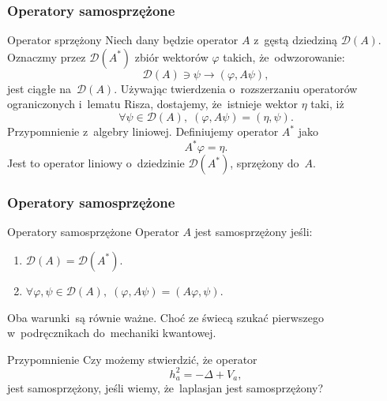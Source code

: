 \documentclass{beamer} \mode<presentation>
\newcommand{\mc}{\mathcal}
\newcommand{\ra}{\rightarrow}
\newcommand{\Del}{\Delta}
\newcommand{\vp}{\varphi}
\newcommand{\D}{\mc{D}}
\newcommand{\DA}{\D( A )}
\begin{document}
\begin{frame}
  \frametitle{Operatory samosprzężone}

  \begin{block}{Operator sprzężony}
    Niech dany będzie operator $A$ z~gęstą dziedziną $\DA$. Oznaczmy
    przez $\D( A^{ * } )$ zbiór wektorów $\vp$ takich,
    że~odwzorowanie:
    \begin{equation}
      \label{eq:12}
      \DA \ni \psi \ra ( \vp, A\psi ),
    \end{equation}
    jest ciągłe na~$\DA$. Używając twierdzenia o~rozszerzaniu
    operatorów ograniczonych i~lematu Risza, dostajemy, że~istnieje
    wektor $\eta$ taki, iż
    \begin{equation}
      \label{eq:13}
      \forall \psi \in \DA, \; ( \vp, A\psi ) = ( \eta, \psi ).
    \end{equation}
    Przypomnienie z~algebry liniowej. Definiujemy operator $A^{ * }$
    jako
    \begin{equation}
      \label{eq:14}
      A^{ * } \vp = \eta.
    \end{equation}
    Jest to operator liniowy o~dziedzinie $\D( A^{ * } )$, sprzężony
    do~$A$.
  \end{block}

\end{frame}



\begin{frame}
  \frametitle{Operatory samosprzężone}

  \begin{block}{Operatory samosprzężone}
    Operator $A$ jest samosprzężony jeśli:
    \begin{enumerate}
    \item $\DA = \D( A^{ * } )$.
    \item
      $\forall \vp, \psi \in \DA, \; ( \vp, A\psi ) = ( A\vp, \psi )$.
    \end{enumerate}
    Oba warunki~są równie ważne. Choć ze świecą szukać pierwszego
    w~podręcznikach do~mechaniki kwantowej.
  \end{block}

  \begin{block}{Przypomnienie} %
    Czy możemy stwierdzić, że operator
    \begin{equation}
      \label{eq:15}
      h_{ a }^{ 2 } = -\Del + V_{ a },
    \end{equation}
    jest samosprzężony, jeśli wiemy, że~laplasjan jest samosprzężony?
  \end{block}
  
\end{frame}
\end{document}
